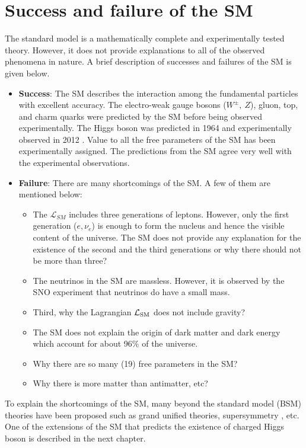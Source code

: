 \section{Success and failure of the SM}
\label{s:meritSM}
The standard model is a mathematically complete and experimentally tested theory.
However, it does not provide explanations to all of the observed phenomena in
nature. A brief description of successes and failures of the SM is given below.
\begin{itemize}[leftmargin=*]
				\item \textbf{Success}: The SM describes the interaction among the 
								fundamental particles with excellent accuracy. The electro-weak
								gauge bosons ($W^\pm, ~Z$), gluon, top, and charm quarks were
								predicted by the SM before being observed experimentally. The
								Higgs boson was predicted in 1964 and experimentally observed in
								2012 \cite{Aad:2015zhl}. Value to all the free parameters of the 
								SM has been experimentally assigned. The predictions from the SM 
								agree very well with the experimental observations.

\item \textbf{Failure}:
There are many shortcomings of the SM. A few of them are mentioned below:  
\begin{itemize}[leftmargin=*]
\item The $\mathcal{L}_{SM}$ includes 
three generations of leptons. However, only the first generation ($e, \nu_e$) is 
enough to form the nucleus and hence the visible content of the universe. The SM
does not provide any explanation for the existence of the second and the third
generations or why there should not be more than three?
\item The neutrinos in the SM are massless. However, it is observed by 
the SNO experiment that neutrinos do have a small mass. 
\item Third, why the Lagrangian $\mathcal{L}_{\rm{SM}}$ does not 
include gravity?
\item The SM does not explain the origin of dark matter \cite{Ade:2013zuv,
Ade:2013sjv} and dark energy which account for about 96\% of the universe. 
\item Why there are so many (19) free parameters in the SM? 
\item Why there is more matter than antimatter, etc? 
\end{itemize}
\end{itemize}
To explain the shortcomings of the SM, many beyond the standard model (BSM) 
theories have been proposed such as grand unified theories, supersymmetry 
\cite{Martin:1997ns}, etc. One of the extensions of the SM that predicts the 
existence of charged Higgs boson is described in the next chapter.
